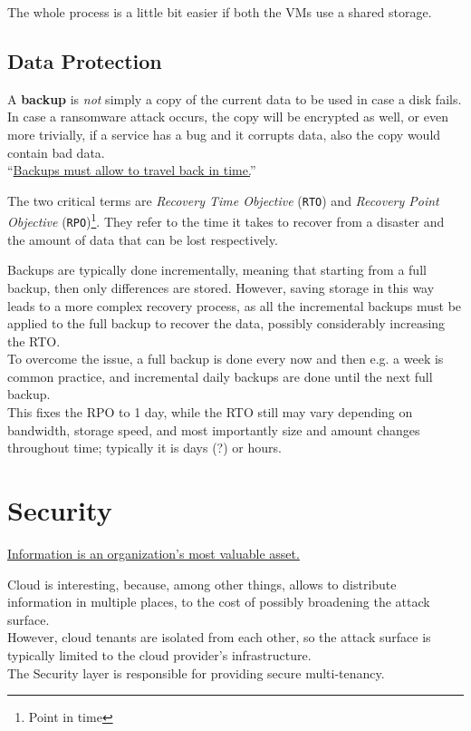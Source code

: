The whole process is a little bit easier if both the VMs use a shared
storage.

\subsection{Data Protection}
\label{sec:dataprotection}
A \textbf{backup} is \textit{not} simply a copy of the current data to be used in case a disk fails. In case a ransomware attack occurs, the copy will be encrypted as well, or even more trivially, if a service has a bug and it corrupts data, also the copy would contain bad data.\\
``\ul{Backups must allow to travel back in time.}''

The two critical terms are \textit{Recovery Time Objective} (\texttt{RTO}) and  \textit{Recovery Point Objective} (\texttt{RPO})\footnote{Point in time}.
They refer to the time it takes to recover from a disaster and the amount of data that can be lost respectively.

Backups are typically done incrementally, meaning that starting from a full backup, then only differences are stored.
However, saving storage in this way leads to a more complex recovery process, as all the incremental backups must be applied to the full backup to recover the data, possibly considerably increasing the RTO.\\
To overcome the issue, a full backup is done every now and then e.g. a week is common practice, and incremental daily backups are done until the next full backup.\\
This fixes the RPO to 1 day, while the RTO still may vary depending on bandwidth, storage speed, and most importantly size and amount changes throughout time; typically it is days (?) or hours.

\section{Security}
\ul{Information is an organization’s most valuable asset.}

Cloud is interesting, because, among other things, allows to distribute information in multiple places, to the cost of possibly broadening the attack surface.\\
However, cloud tenants are isolated from each other, so the attack surface is typically limited to the cloud provider's infrastructure.\\
The Security layer is responsible for providing secure multi-tenancy.

